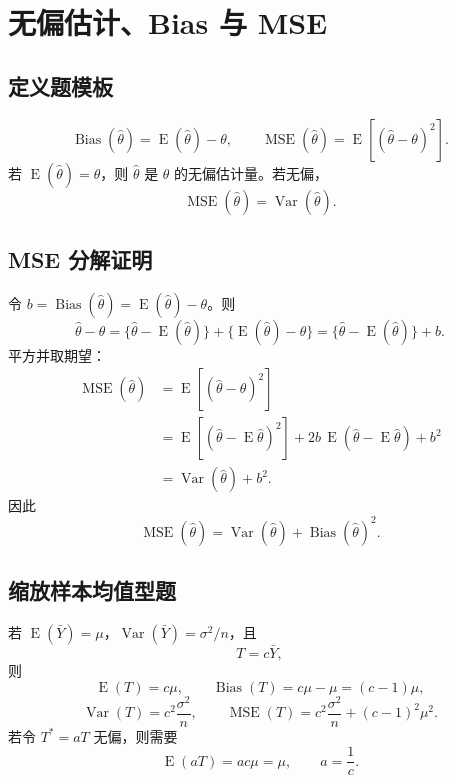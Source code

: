 \documentclass[11pt,a4paper]{article}
\newcommand{\E}{\operatorname{E}}
\newcommand{\Var}{\operatorname{Var}}
\newcommand{\Bias}{\operatorname{Bias}}
\newcommand{\MSE}{\operatorname{MSE}}
\begin{document}
\section{无偏估计、Bias 与 MSE}

\subsection{定义题模板}

\begin{memorybox}[必须会写]
\[
  \Bias(\hat\theta)=\E(\hat\theta)-\theta,
  \qquad
  \MSE(\hat\theta)=\E[(\hat\theta-\theta)^2].
\]
若 $\E(\hat\theta)=\theta$，则 $\hat\theta$ 是 $\theta$ 的无偏估计量。若无偏，
\[
  \MSE(\hat\theta)=\Var(\hat\theta).
\]
\end{memorybox}

\subsection{MSE 分解证明}

\begin{proofbox}[可直接背的证明]
令 $b=\Bias(\hat\theta)=\E(\hat\theta)-\theta$。则
\[
  \hat\theta-\theta
  =
  \{\hat\theta-\E(\hat\theta)\}
  +
  \{\E(\hat\theta)-\theta\}
  =
  \{\hat\theta-\E(\hat\theta)\}+b.
\]
平方并取期望：
\[
\begin{aligned}
  \MSE(\hat\theta)
  &=\E[(\hat\theta-\theta)^2]\\
  &=\E[(\hat\theta-\E\hat\theta)^2]
    +2b\,\E(\hat\theta-\E\hat\theta)+b^2\\
  &=\Var(\hat\theta)+b^2.
\end{aligned}
\]
因此
\[
  \boxed{\MSE(\hat\theta)=\Var(\hat\theta)+\Bias(\hat\theta)^2}.
\]
\end{proofbox}

\subsection{缩放样本均值型题}

\begin{methodbox}[缩放样本均值型题]
若 $\E(\bar Y)=\mu$，$\Var(\bar Y)=\sigma^2/n$，且
\[
  T=c\bar Y,
\]
则
\[
  \E(T)=c\mu,
  \qquad
  \Bias(T)=c\mu-\mu=(c-1)\mu,
\]
\[
  \Var(T)=c^2\frac{\sigma^2}{n},
  \qquad
  \MSE(T)=c^2\frac{\sigma^2}{n}+(c-1)^2\mu^2.
\]
若令 $T^*=aT$ 无偏，则需要
\[
  \E(aT)=ac\mu=\mu,
  \qquad
  \boxed{a=\frac1c}.
\]
\end{methodbox}
\end{document}
